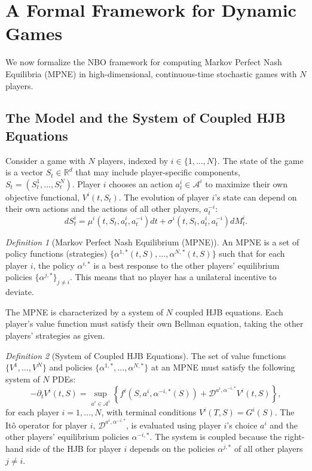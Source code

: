 \documentclass[ecta,draft]{econsocart}
\theoremstyle{plain}
\theoremstyle{remark}
\newtheorem{definition}{Definition}
\newcommand{\R}{\mathbb{R}}
\newcommand{\diffop}{\mathcal{D}}
\begin{document}
\section{A Formal Framework for Dynamic Games}
\label{sec:supp_games}

We now formalize the NBO framework for computing Markov Perfect Nash Equilibria (MPNE) in high-dimensional, continuous-time stochastic games with $N$ players.

\subsection{The Model and the System of Coupled HJB Equations}

Consider a game with $N$ players, indexed by $i \in \{1, \dots, N\}$. The state of the game is a vector $S_t \in \R^d$ that may include player-specific components, $S_t = (S_t^1, \dots, S_t^N)$. Player $i$ chooses an action $a_t^i \in \mathcal{A}^i$ to maximize their own objective functional, $V^i(t,S_t)$. The evolution of player $i$'s state can depend on their own actions and the actions of all other players, $a_t^{-i}$:
\begin{equation}
dS_t^i = \mu^i(t, S_t, a_t^i, a_t^{-i})dt + \sigma^i(t, S_t, a_t^i, a_t^{-i})dM_t^i.
\end{equation}

\begin{definition}[Markov Perfect Nash Equilibrium (MPNE)]
An MPNE is a set of policy functions (strategies) $\{\alpha^{1,*}(t,S), \dots, \alpha^{N,*}(t,S)\}$ such that for each player $i$, the policy $\alpha^{i,*}$ is a best response to the other players' equilibrium policies $\{\alpha^{j,*}\}_{j \neq i}$. This means that no player has a unilateral incentive to deviate.
\end{definition}

The MPNE is characterized by a system of $N$ coupled HJB equations. Each player's value function must satisfy their own Bellman equation, taking the other players' strategies as given.

\begin{definition}[System of Coupled HJB Equations]
The set of value functions $\{V^1, \dots, V^N\}$ and policies $\{\alpha^{1,*}, \dots, \alpha^{N,*}\}$ at an MPNE must satisfy the following system of $N$ PDEs:
\begin{equation} \label{eq:supp_hjb_game}
-\partial_t V^i(t,S) = \sup_{a^i \in \mathcal{A}^i} \left\{ f^i(S, a^i, \alpha^{-i,*}(S)) + \diffop^{a^i, \alpha^{-i,*}}V^i(t,S) \right\},
\end{equation}
for each player $i=1, \dots, N$, with terminal conditions $V^i(T,S) = G^i(S)$. The It\^o operator for player $i$, $\diffop^{a^i, \alpha^{-i,*}}$, is evaluated using player $i$'s choice $a^i$ and the other players' equilibrium policies $\alpha^{-i,*}$. The system is coupled because the right-hand side of the HJB for player $i$ depends on the policies $\alpha^{j,*}$ of all other players $j \neq i$.
\end{definition}
\end{document}
